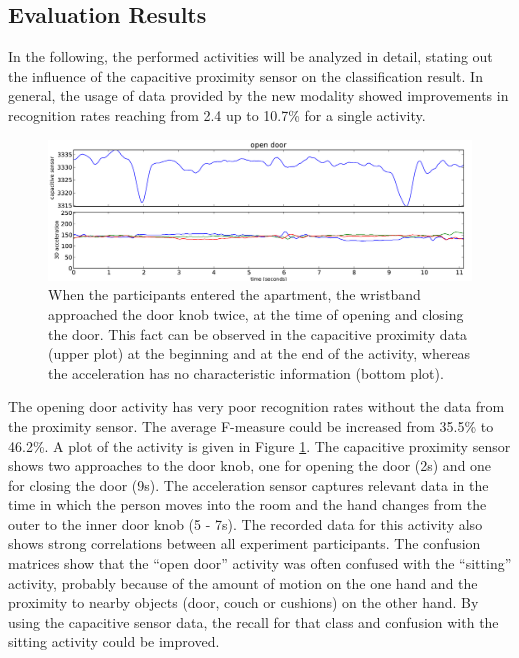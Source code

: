 \documentclass[runningheads,a4paper]{llncs}
\begin{document}
\subsection{Evaluation Results}
\label{sect:evaluation}

In the following, the performed activities will be analyzed in detail, stating out the influence of the capacitive proximity sensor on the classification result. In general, the usage of data provided by the new modality showed improvements in recognition rates reaching from 2.4 up to 10.7\% for a single activity.

\begin{figure}
	\centering
		\includegraphics[width=1.00\textwidth]{../Auswertung/images/tobias_1.pdf}
	\caption{When the participants entered the apartment, the wristband approached the door knob twice, at the time of opening and closing the door. This fact can be observed in the capacitive proximity data (upper plot) at the beginning and at the end of the activity, whereas the acceleration has no characteristic information (bottom plot).}
	\label{fig:opendoor}
\end{figure}

The opening door activity has very poor recognition rates without the data from the proximity sensor. The average F-measure could be increased from 35.5\% to 46.2\%. A plot of the activity is given in Figure \ref{fig:opendoor}. The capacitive proximity sensor shows two approaches to the door knob, one for opening the door (2s) and one for closing the door (9s). The acceleration sensor captures relevant data in the time in which the person moves into the room and the hand changes from the outer to the inner door knob (5 - 7s). The recorded data for this activity also shows strong correlations between all experiment participants. The confusion matrices show that the ``open door'' activity was often confused with the ``sitting'' activity, probably because of the amount of motion on the one hand and the proximity to nearby objects (door, couch or cushions) on the other hand. By using the capacitive sensor data, the recall for that class and confusion with the sitting activity could be improved. 
\end{document}
